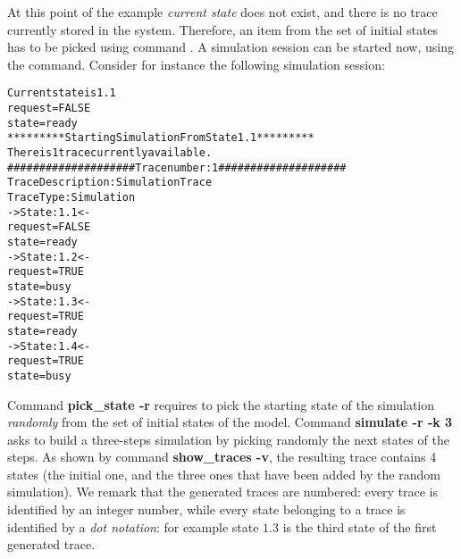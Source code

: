 At this point of the example \emph{current state} does not exist, and there
is no trace currently stored in the system. Therefore,
an item from the set of initial states
has to be picked using command .
A simulation session can be started now, using the 
command.
Consider for instance the following simulation session:
\begin{alltt}
\shellprompt {}
\nusmvprompt {}
\nusmvprompt {}
\nusmvprompt {}
Current state is 1.1
request = FALSE
state = ready
\nusmvprompt {}
*********  Starting Simulation From State  1.1  *********
\nusmvprompt {}
There is 1 trace currently available.
\nusmvprompt {}
#################### Trace number: 1 ####################
Trace Description: Simulation Trace
Trace Type: Simulation
-> State: 1.1 <-
    request = FALSE
    state = ready
-> State: 1.2 <-
    request = TRUE
    state = busy
-> State: 1.3 <-
    request = TRUE
    state = ready
-> State: 1.4 <-
    request = TRUE
    state = busy
\end{alltt}

Command {\bf pick\_state -r} requires to pick the starting state of the
simulation \emph{randomly} from the set of initial states of the model.
Command {\bf simulate -r -k 3} asks to build a three-steps simulation by 
picking randomly the next states of the steps.
As shown by command {\bf show\_traces -v}, 
the resulting trace contains 4 states (the initial one, and the three ones
that have been added by the random simulation).
We remark that the generated traces are numbered: every trace is
identified by an integer number, while every state belonging to a trace
is identified by a \emph{dot notation}: for example state $1.3$ is the
third state of the first generated trace.

